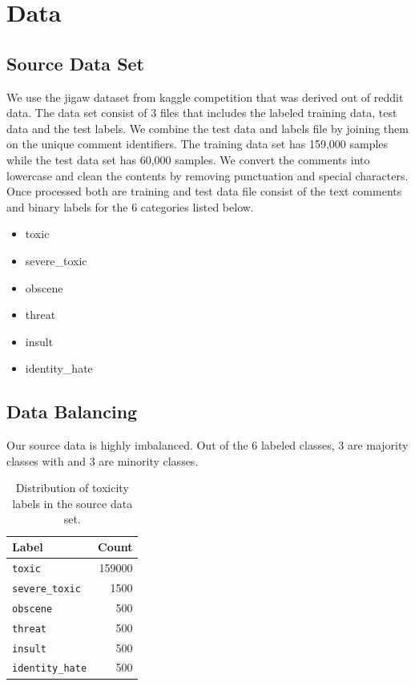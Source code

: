 \documentclass[11pt,a4paper]{article}
\begin{document}
\section{Data}

\subsection{Source Data Set}
We use the jigaw dataset from kaggle competition that was derived out of reddit data. The data set consist of 3 files that includes the labeled training data, test data and the test labels. We combine the test data and labels file by joining them on the unique comment identifiers. The training data set has 159,000 samples while the test data set has 60,000 samples. We convert the comments into lowercase and clean the contents by removing punctuation and special characters. Once processed both are training and test data file  consist of the text comments and binary labels for the 6 categories listed below.

\begin{itemize}
\item toxic
\item severe\_toxic
\item obscene
\item threat
\item insult
\item identity\_hate
\end{itemize}

\subsection{Data Balancing}
Our source data is highly imbalanced. Out of the 6 labeled classes, 3 are majority classes with and 3 are minority classes.
\begin{table}
\centering
\begin{tabular}{l r}
\hline
\textbf{Label} & \textbf{Count}\\
\hline
\verb|toxic| & 159000 \\
\verb|severe_toxic| & 1500 \\
\verb|obscene| & 500 \\ 
\verb|threat| & 500 \\ 
\verb|insult| & 500 \\
\verb|identity_hate| & 500 \\
\hline 
\end{tabular}
\caption{Distribution of toxicity labels in the source data set.}
\end{table}
\end{document}
